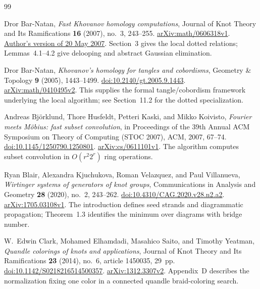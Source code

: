 \begin{thebibliography}{99}

Dror Bar-Natan,
\emph{Fast Khovanov homology computations},
Journal of Knot Theory and Its Ramifications
\textbf{16} (2007), no.~3, 243--255.
\href{https://arxiv.org/abs/math/0606318v1}{arXiv:math/0606318v1}.
\href{https://www.math.utoronto.ca/~drorbn/papers/FastKh/FastKh.pdf}{Author's version of 20 May 2007}.
Section~3 gives the local dotted relations; Lemmas~4.1--4.2 give
delooping and abstract Gaussian elimination.

Dror Bar-Natan,
\emph{Khovanov's homology for tangles and cobordisms},
Geometry \& Topology \textbf{9} (2005), 1443--1499.
\href{https://doi.org/10.2140/gt.2005.9.1443}{doi:10.2140/gt.2005.9.1443}.
\href{https://arxiv.org/abs/math/0410495v2}{arXiv:math/0410495v2}.
This supplies the formal tangle/cobordism framework underlying the local
algorithm; see Section~11.2 for the dotted specialization.

Andreas Bj\"orklund, Thore Husfeldt, Petteri Kaski, and Mikko Koivisto,
\emph{Fourier meets M\"obius: fast subset convolution},
in Proceedings of the 39th Annual ACM Symposium on Theory of Computing
(STOC 2007), ACM, 2007, 67--74.
\href{https://doi.org/10.1145/1250790.1250801}{doi:10.1145/1250790.1250801}.
\href{https://arxiv.org/abs/cs/0611101v1}{arXiv:cs/0611101v1}.
The algorithm computes subset convolution in $O(r^2 2^r)$ ring operations.

Ryan Blair, Alexandra Kjuchukova, Roman Velazquez, and Paul Villanueva,
\emph{Wirtinger systems of generators of knot groups},
Communications in Analysis and Geometry
\textbf{28} (2020), no.~2, 243--262.
\href{https://doi.org/10.4310/CAG.2020.v28.n2.a2}{doi:10.4310/CAG.2020.v28.n2.a2}.
\href{https://arxiv.org/abs/1705.03108v1}{arXiv:1705.03108v1}.
The introduction defines seed strands and diagrammatic propagation;
Theorem~1.3 identifies the minimum over diagrams with bridge number.

W.~Edwin Clark, Mohamed Elhamdadi, Masahico Saito, and Timothy Yeatman,
\emph{Quandle colorings of knots and applications},
Journal of Knot Theory and Its Ramifications
\textbf{23} (2014), no.~6, article 1450035, 29~pp.
\href{https://doi.org/10.1142/S0218216514500357}{doi:10.1142/S0218216514500357}.
\href{https://arxiv.org/abs/1312.3307v2}{arXiv:1312.3307v2}.
Appendix~D describes the normalization fixing one color in a connected
quandle braid-coloring search.


\end{thebibliography}
